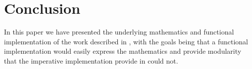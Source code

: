 \documentclass[twocolumn]{article}
\begin{document}
\section{Conclusion}
In this paper we have presented the underlying mathematics and functional
implementation of the work described in \cite{chen}, with the goals being that a
functional implementation would easily express the mathematics and provide
modularity that the imperative implementation provide in \cite{chen} could not.




\end{document}

